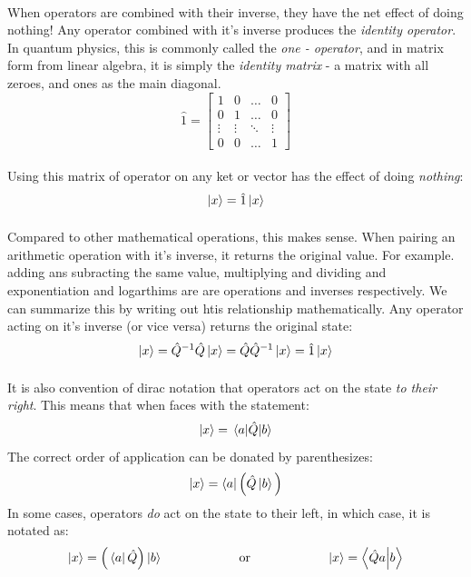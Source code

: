 \documentclass[12pt,letterpaper]{book}
\begin{document}
\paragraph*{}When operators are combined with their inverse, they have the net effect of doing nothing! Any operator combined with it's inverse produces the \textit{identity operator}. In quantum physics, this is commonly called the \textit{one - operator}, and in matrix form from linear algebra, it is simply the \textit{identity matrix} - a matrix with all zeroes, and ones as the main diagonal.
\begin{equation}
\label{identity}
\hat{1} = 
\begin{bmatrix}
1 & 0 & \hdots & 0 \\
0 & 1 & \hdots & 0 \\
\vdots & \vdots & \ddots & \vdots \\
0 & 0 & \hdots & 1
\end{bmatrix}
\end{equation}
\paragraph*{}Using this matrix of operator on any ket or vector has the effect of doing \textit{nothing}:
\begin{equation}
\ket{x} = \hat{1}\ket{x}
\end{equation}
\paragraph*{}Compared to other mathematical operations, this makes sense. When pairing an arithmetic operation with it's inverse, it returns the original value. For example. adding ans subracting the same value, multiplying and dividing and exponentiation and logarthims are are operations and inverses respectively. We can summarize this by writing out htis relationship mathematically. Any operator acting on it's inverse (or vice versa) returns the original state:
\begin{equation}
\ket{x} = \hat{Q}^{-1}\hat{Q}\ket{x} = \hat{Q}\hat{Q}^{-1}\ket{x} =
 \hat{1}\ket{x} 
\end{equation}
\paragraph*{}It is also convention of dirac notation that operators act on the state \textit{to their right}. This means that when faces with the statement:
\begin{equation}
\ket{x} = \mel{a}{\hat{Q}}{b}
\end{equation}
The correct order of application can be donated by parenthesizes:
\begin{equation}
\ket{x} = \bra{a}\Big( \hat{Q}\ket{b} \Big)
\end{equation}
In some cases, operators \textit{do} act on the state to their left, in which case, it is notated as:
\begin{equation}
\ket{x} = \Big(\bra{a}\hat{Q}\Big)\ket{b} 
\text{\hspace{2cm} or \hspace{2cm}}
\ket{x} = \braket{\hat{Q}a}{b}
\end{equation}
\end{document}
